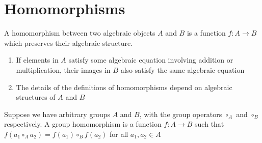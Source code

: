 \section{Homomorphisms}
A homomorphism between two algebraic objects $A$ and $B$ is a function $f: A \rightarrow B$ which preserves their algebraic structure. 
\begin{enumerate}
    \item If elements in $A$ satisfy some algebraic equation involving addition or multiplication, their images in $B$ also satisfy the same algebraic equation
    \item The details of the definitions of homomorphisms depend on algebraic structures of $A$ and $B$
\end{enumerate}

\begin{definition}
Suppose we have arbitrary groups $A$ and $B$, with the group operators $\circ_A$ and $\circ_B$ respectively. A group homomorphism is a function $f: A \rightarrow B$ such that $f(a_1 \circ_A a_2) = f(a_1) \circ_B f(a_2)$ for all $a_1,a_2 \in A$
\end{definition}